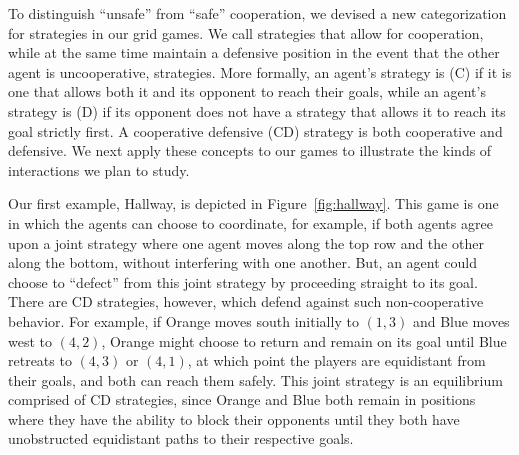 To distinguish ``unsafe'' from ``safe'' cooperation, we devised a new
categorization for strategies in our grid games.  We call strategies
that allow for cooperation, while at the same time maintain a
defensive position in the event that the other agent is uncooperative,
 strategies.  More formally, an agent's
strategy is  (C) if it is one that allows both it
and its opponent to reach their goals, while an agent's strategy is
 (D) if its opponent does not have a strategy that
allows it to reach its goal strictly first.  A cooperative defensive
(CD) strategy is both cooperative and defensive.
We next apply these concepts to our games to illustrate the kinds
of interactions we plan to study.

Our first example, Hallway, is depicted in Figure~\ref{fig:hallway}.
This game is one in which the agents can choose to coordinate, for
example, if both agents agree upon a joint strategy where one agent
moves along the top row and the other along the bottom, without
interfering with one another.  But, an agent could choose to ``defect''
from this joint strategy by proceeding straight to its goal.  There
are CD strategies, however, which defend against such non-cooperative
behavior.
%
For example, if Orange moves south initially to $(1,3)$ and Blue moves
west to $(4,2)$, Orange might choose to return and remain on its goal
until Blue retreats to $(4,3)$ or $(4,1)$, at which point the players
are equidistant from their goals, and both can reach them safely.
This joint strategy is an equilibrium comprised of CD strategies,
since Orange and Blue both remain in positions where they have the
ability to block their opponents until they both have unobstructed
equidistant paths to their respective goals.


